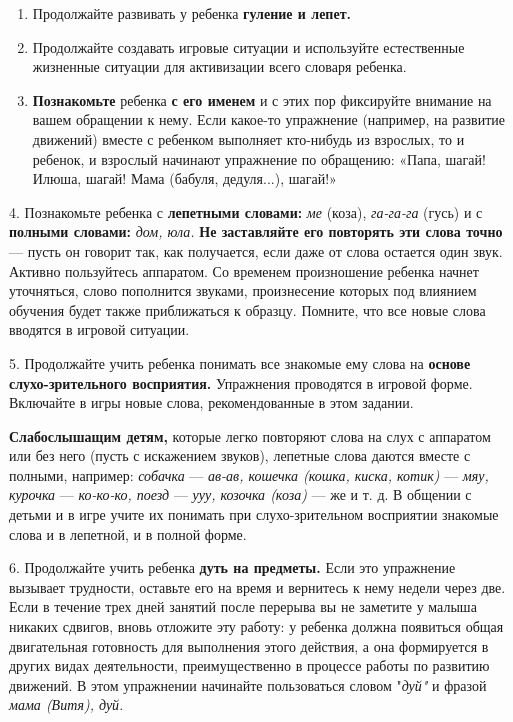 \documentclass[a5paper]{book}
\renewcommand{\emph}[1]{\textit{#1}}
\begin{document}
\begin{enumerate}
\def\labelenumi{\arabic{enumi}.}
\item
  
  Продолжайте развивать у ребенка \textbf{гуление и лепет.}
  
\item
  
  Продолжайте создавать игровые ситуации и используйте естественные
  жизненные ситуации для активизации всего словаря ребенка.
  
\item
  
  \textbf{Познакомьте} ребенка \textbf{с его именем} и с этих пор
  фиксируйте внимание на вашем обращении к нему. Если какое-то
  упражнение (например, на развитие движений) вместе с ребенком
  выполняет кто-нибудь из взрослых, то и ребенок, и взрослый начинают
  упражнение по обращению: «Папа, шагай! Илюша, шагай! Мама (бабуля,
  дедуля...), шагай!»
  
\end{enumerate}


4. Познакомьте ребенка с \textbf{лепетными словами:} \emph{ме} (коза),
\emph{га-га-га} (гусь) и с \textbf{полными словами:} \emph{дом, юла.}
\textbf{Не заставляйте его повторять эти слова точно} --- пусть он
говорит так, как получается, если даже от слова остается один звук.
Активно пользуйтесь аппаратом. Со временем произношение ребенка начнет
уточняться, слово пополнится звуками, произнесение которых под влиянием
обучения будет также приближаться к образцу. Помните, что все новые
слова вводятся в игровой ситуации.

5. Продолжайте учить ребенка понимать все знакомые ему слова на
\textbf{основе слухо-зрительного восприятия.} Упражнения проводятся в
игровой форме. Включайте в игры новые слова, рекомендованные в этом
задании.

\textbf{Слабослышащим детям,} которые легко повторяют слова на слух с
аппаратом или без него (пусть с искажением звуков), лепетные слова
даются вместе с полными, например: \emph{собачка} --- \emph{ав-ав,
кошечка (кошка, киска, котик)} --- \emph{мяу, курочка} ---
\emph{ко-ко-ко, поезд} --- \emph{ууу, козочка (коза)} --- же и т. д. В
общении с детьми и в игре учите их понимать при слухо-зрительном
восприятии знакомые слова и в лепетной, и в полной форме.

6. Продолжайте учить ребенка \textbf{дуть на предметы.} Если это
упражнение вызывает трудности, оставьте его на время и вернитесь к нему
недели через две. Если в течение трех дней занятий после перерыва вы не
заметите у малыша никаких сдвигов, вновь отложите эту работу: у ребенка
должна появиться общая двигательная готовность для выполнения этого
действия, а она формируется в других видах деятельности, преимущественно
в процессе работы по развитию движений. В этом упражнении начинайте
пользоваться словом "\emph{дуй"} и фразой \emph{мама (Витя), дуй.}
\end{document}
